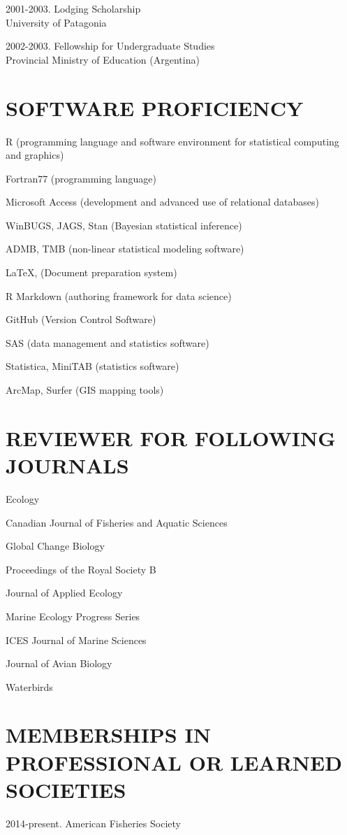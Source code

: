 \documentclass{res}
\begin{document}
\begin{resume}
\begin{hangparas}{.4in}{1}
2001-2003. Lodging Scholarship\\
University of Patagonia

2002-2003. Fellowship for Undergraduate Studies\\
Provincial Ministry of Education (Argentina)
\end{hangparas}
\section{SOFTWARE PROFICIENCY}
\vspace{0.2in} 

R (programming language and software environment for statistical computing and graphics)

Fortran77 (programming language)

Microsoft Access (development and advanced use of relational databases)

WinBUGS, JAGS, Stan (Bayesian statistical inference)

ADMB, TMB (non-linear statistical modeling software)

\LaTeX,  (Document preparation system)

R Markdown (authoring framework for data science)

GitHub (Version Control Software)

SAS (data management and statistics software)

Statistica, MiniTAB (statistics software)

ArcMap, Surfer (GIS mapping tools)



\section{REVIEWER FOR FOLLOWING JOURNALS}
\vspace{0.2in}
Ecology

Canadian Journal of Fisheries and Aquatic Sciences

Global Change Biology

Proceedings of the Royal Society B

Journal of Applied Ecology

Marine Ecology Progress Series

ICES Journal of Marine Sciences

Journal of Avian Biology

Waterbirds

\section{MEMBERSHIPS IN PROFESSIONAL OR LEARNED SOCIETIES}
\vspace{0.2in}
\begin{hangparas}{.4in}{1}
2014-present. American Fisheries Society


\end{hangparas}
\end{resume}
\end{document}
